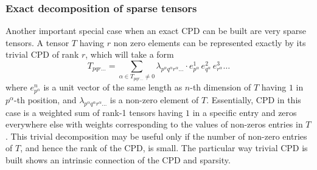 \subsubsection{Exact decomposition of sparse tensors}
Another important special case when an exact CPD can be built are very sparse 
tensors. A tensor $T$ having $r$ non zero elements can be represented exactly 
by its trivial CPD of rank $r$, which will take a form
%
\begin{equation}
T_{pqr\ldots} = \sum_{\alpha \in T_{pqr\ldots} \neq 0} \lambda_{p^\alpha 
q^{\alpha} 
r^{\alpha}\ldots} \cdot e^{1}_{p^{\alpha}} \, e^{2}_{q^\alpha} \, 
e^{3}_{r^\alpha} \ldots
\label{eq:trivial_cpd_dec}
\end{equation}
%
where $e^{n}_{p^{\alpha}}$ is a unit vector of the same length as $n$-th 
dimension of $T$ having $1$ in $p^{\alpha}$-th position, and 
$\lambda_{p^{\alpha}q^{\alpha}r^{\alpha}\ldots}$ is a non-zero element of 
$T$. Essentially, CPD in this case is a weighted sum of rank-1 tensors having 
$1$ in a specific entry and 
zeros everywhere else with 
weights corresponding to the values of non-zeros entries in $T$. This 
trivial decomposition may be useful only if the number of non-zero entries of 
$T$, and hence the rank of the CPD, is small. The particular way trivial CPD 
is built shows an intrinsic connection of the CPD and sparsity.

